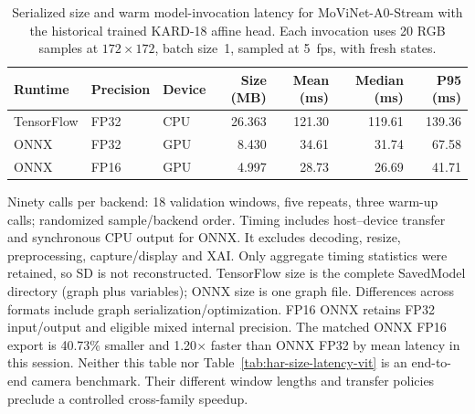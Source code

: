 \begin{table}[t]
\centering
\small
\caption{Serialized size and warm model-invocation latency for MoViNet-A0-Stream with the historical trained KARD-18 affine head. Each invocation uses 20 RGB samples at $172\times172$, batch size~1, sampled at 5~fps, with fresh states.}
\label{tab:har-size-latency-kard}
\setlength{\tabcolsep}{5pt}
\begin{tabular*}{\textwidth}{@{\extracolsep{\fill}}lllrrrr@{}}
\toprule
Runtime & Precision & Device & Size (MB) & Mean (ms) & Median (ms) & P95 (ms) \\
\midrule
TensorFlow & FP32 & CPU & 26.363 & 121.30 & 119.61 & 139.36 \\
ONNX & FP32 & GPU & 8.430 & 34.61 & 31.74 & 67.58 \\
ONNX & FP16 & GPU & 4.997 & 28.73 & 26.69 & 41.71 \\
\bottomrule
\end{tabular*}
\par\smallskip
\begin{minipage}{\textwidth}\footnotesize
Ninety calls per backend: 18 validation windows, five repeats, three warm-up calls; randomized sample/backend order. Timing includes host--device transfer and synchronous CPU output for ONNX. It excludes decoding, resize, preprocessing, capture/display and XAI. Only aggregate timing statistics were retained, so SD is not reconstructed. TensorFlow size is the complete SavedModel directory (graph plus variables); ONNX size is one graph file. Differences across formats include graph serialization/optimization. FP16 ONNX retains FP32 input/output and eligible mixed internal precision. The matched ONNX FP16 export is 40.73\% smaller and 1.20$\times$ faster than ONNX FP32 by mean latency in this session. Neither this table nor Table~\ref{tab:har-size-latency-vit} is an end-to-end camera benchmark. Their different window lengths and transfer policies preclude a controlled cross-family speedup.
\end{minipage}
\end{table}

